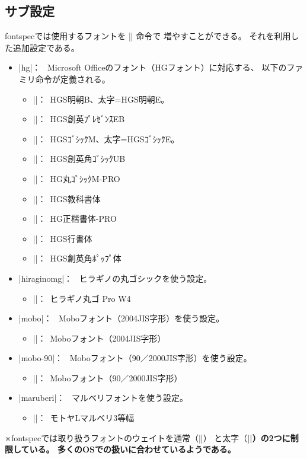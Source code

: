 \documentclass[a4paper]{bxjsarticle}
\newcommand{\Pkg}[1]{\textsf{#1}}
\newcommand{\Note}{\par\noindent ※}
\newcommand{\Means}{：\ }
\begin{document}
\subsection{サブ設定}

\Pkg{fontspec}では使用するフォントを |\newfontfamily| 命令で
増やすことができる。
それを利用した追加設定である。

\begin{itemize}
\item |hg|\Means
Microsoft Officeのフォント（HGフォント）に対応する、
以下のファミリ命令が定義される。
\begin{itemize}
\item |\hgmcfamily|\Means HGS明朝B、太字=HGS明朝E。
\item |\hgprfamily|\Means HGS創英ﾌﾟﾚｾﾞﾝｽEB
\item |\hggtfamily|\Means HGSｺﾞｼｯｸM、太字=HGSｺﾞｼｯｸE。
\item |\hggufamily|\Means HGS創英角ｺﾞｼｯｸUB
\item |\hgmgfamily|\Means HG丸ｺﾞｼｯｸM-PRO
\item |\hgkkfamily|\Means HGS教科書体
\item |\hgksfamily|\Means HG正楷書体-PRO
\item |\hggsfamily|\Means HGS行書体
\item |\hgppfamily|\Means HGS創英角ﾎﾟｯﾌﾟ体
\end{itemize}

\item |hiraginomg|\Means
ヒラギノの丸ゴシックを使う設定。
\begin{itemize}
\item |\hmgfamily|\Means ヒラギノ丸ゴ Pro W4
\end{itemize}

\item |mobo|\Means
Moboフォント（2004JIS字形）を使う設定。
\begin{itemize}
\item |\mobofamily|\Means Moboフォント（2004JIS字形）
\end{itemize}

\item |mobo-90|\Means
Moboフォント（90／2000JIS字形）を使う設定。
\begin{itemize}
\item |\mobofamily|\Means Moboフォント（90／2000JIS字形）
\end{itemize}

\item |maruberi|\Means
マルベリフォントを使う設定。
\begin{itemize}
\item |\mmgfamily|\Means モトヤLマルベリ3等幅
\end{itemize}
\end{itemize}
\Note \Pkg{fontspec}では取り扱うフォントのウェイトを通常（|\mdseries|）
と太字（|\bfseries|）の2つに制限している。
多くのOSでの扱いに合わせているようである。
\end{document}
